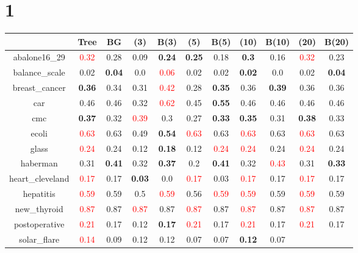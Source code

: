 \documentclass{article}%
\begin{document}
\section*{1}%
\begin{tabular}{c|cccccccccc}%
\hline%
&Tree&BG&(3)&B(3)&(5)&B(5)&(10)&B(10)&(20)&B(20)\\%
\hline%
abalone16\_29&\textcolor{red}{ 
0.32
}&0.28&0.09&\textbf{0.24}&\textbf{0.25}&0.18&\textbf{0.3}&0.16&\textcolor{red}{ 
0.32
}&0.23\\%
\hline%
balance\_scale&0.02&\textbf{0.04}&0.0&\textcolor{red}{ 
0.06
}&0.02&0.02&\textbf{0.02}&0.0&0.02&\textbf{0.04}\\%
\hline%
breast\_cancer&\textbf{0.36}&0.34&0.31&\textcolor{red}{ 
0.42
}&0.28&\textbf{0.35}&0.36&\textbf{0.39}&0.36&0.36\\%
\hline%
car&0.46&0.46&0.32&\textcolor{red}{ 
0.62
}&0.45&\textbf{0.55}&0.46&0.46&0.46&0.46\\%
\hline%
cmc&\textbf{0.37}&0.32&\textcolor{red}{ 
0.39
}&0.3&0.27&\textbf{0.33}&\textbf{0.35}&0.31&\textbf{0.38}&0.33\\%
\hline%
ecoli&\textcolor{red}{ 
0.63
}&0.63&0.49&\textbf{0.54}&\textcolor{red}{ 
0.63
}&0.63&\textcolor{red}{ 
0.63
}&0.63&\textcolor{red}{ 
0.63
}&0.63\\%
\hline%
glass&\textcolor{red}{ 
0.24
}&0.24&0.12&\textbf{0.18}&0.12&\textcolor{red}{ 
0.24
}&\textcolor{red}{ 
0.24
}&0.24&\textcolor{red}{ 
0.24
}&0.24\\%
\hline%
haberman&0.31&\textbf{0.41}&0.32&\textbf{0.37}&0.2&\textbf{0.41}&0.32&\textcolor{red}{ 
0.43
}&0.31&\textbf{0.33}\\%
\hline%
heart\_cleveland&\textcolor{red}{ 
0.17
}&0.17&\textbf{0.03}&0.0&\textcolor{red}{ 
0.17
}&0.03&\textcolor{red}{ 
0.17
}&0.17&\textcolor{red}{ 
0.17
}&0.17\\%
\hline%
hepatitis&\textcolor{red}{ 
0.59
}&0.59&0.5&\textcolor{red}{ 
0.59
}&0.56&\textcolor{red}{ 
0.59
}&\textcolor{red}{ 
0.59
}&0.59&\textcolor{red}{ 
0.59
}&0.59\\%
\hline%
new\_thyroid&\textcolor{red}{ 
0.87
}&0.87&\textcolor{red}{ 
0.87
}&0.87&\textcolor{red}{ 
0.87
}&0.87&\textcolor{red}{ 
0.87
}&0.87&\textcolor{red}{ 
0.87
}&0.87\\%
\hline%
postoperative&\textcolor{red}{ 
0.21
}&0.17&0.12&\textbf{0.17}&\textcolor{red}{ 
0.21
}&0.17&\textcolor{red}{ 
0.21
}&0.17&\textcolor{red}{ 
0.21
}&0.17\\%
\hline%
solar\_flare&\textcolor{red}{ 
0.14
}&0.09&0.12&0.12&0.07&0.07&\textbf{0.12}&0.07&\textcolor{red}{ 
}
\end{tabular}
\end{document}
